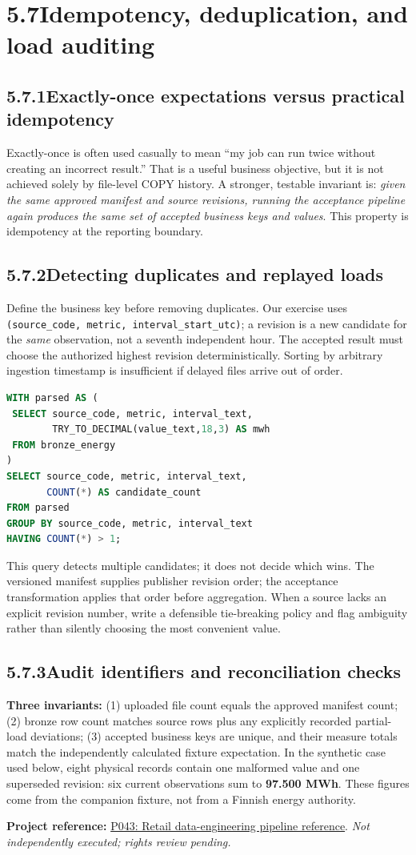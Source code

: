 \documentclass[11pt,twoside]{article}
\newcommand{\topic}[2]{\subsection*{#1\quad #2}}
\newcommand{\repo}[2]{\par\begingroup\fontsize{8.0}{9.6}\selectfont\sffamily\color{inkgray}\textbf{Project reference:} \href{#2}{#1}. \textit{Not independently executed; rights review pending.}\par\endgroup}
\begin{document}
\section*{5.7\quad Idempotency, deduplication, and load auditing}
\topic{5.7.1}{Exactly-once expectations versus practical idempotency}
Exactly-once is often used casually to mean ``my job can run twice without creating an incorrect result.'' That is a useful business objective, but it is not achieved solely by file-level COPY history. A stronger, testable invariant is: \emph{given the same approved manifest and source revisions, running the acceptance pipeline again produces the same set of accepted business keys and values}. This property is idempotency at the reporting boundary.

\topic{5.7.2}{Detecting duplicates and replayed loads}
Define the business key before removing duplicates. Our exercise uses \texttt{(source\_code, metric, interval\_start\_utc)}; a revision is a new candidate for the \emph{same} observation, not a seventh independent hour. The accepted result must choose the authorized highest revision deterministically. Sorting by arbitrary ingestion timestamp is insufficient if delayed files arrive out of order.

\begin{lstlisting}[language=SQL,caption={Find repeated business observations before publication.}]
WITH parsed AS (
 SELECT source_code, metric, interval_text,
        TRY_TO_DECIMAL(value_text,18,3) AS mwh
 FROM bronze_energy
)
SELECT source_code, metric, interval_text,
       COUNT(*) AS candidate_count
FROM parsed
GROUP BY source_code, metric, interval_text
HAVING COUNT(*) > 1;
\end{lstlisting}
This query detects multiple candidates; it does not decide which wins. The versioned manifest supplies publisher revision order; the acceptance transformation applies that order before aggregation. When a source lacks an explicit revision number, write a defensible tie-breaking policy and flag ambiguity rather than silently choosing the most convenient value.

\topic{5.7.3}{Audit identifiers and reconciliation checks}
\textbf{Three invariants:} (1) uploaded file count equals the approved manifest count; (2) bronze row count matches source rows plus any explicitly recorded partial-load deviations; (3) accepted business keys are unique, and their measure totals match the independently calculated fixture expectation. In the synthetic case used below, eight physical records contain one malformed value and one superseded revision: six current observations sum to \textbf{97.500 MWh}. These figures come from the companion fixture, not from a Finnish energy authority.
\repo{P043: Retail data-engineering pipeline reference}{https://github.com/Snowflake-Labs/sfguide-building-retail-analytics-de-pipeline}
\newpage
\end{document}
